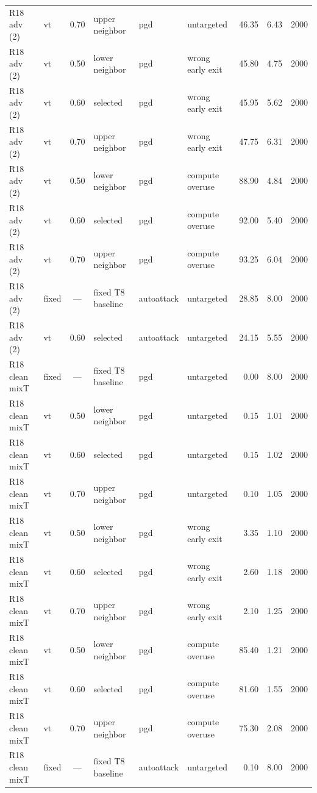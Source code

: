 {\begin{longtable}{@{}l l c l l l r r r@{}}
R18 adv (2) & vt & 0.70 & upper neighbor & pgd & untargeted & 46.35 & 6.43 & 2000 \\
R18 adv (2) & vt & 0.50 & lower neighbor & pgd & wrong early exit & 45.80 & 4.75 & 2000 \\
R18 adv (2) & vt & 0.60 & selected & pgd & wrong early exit & 45.95 & 5.62 & 2000 \\
R18 adv (2) & vt & 0.70 & upper neighbor & pgd & wrong early exit & 47.75 & 6.31 & 2000 \\
R18 adv (2) & vt & 0.50 & lower neighbor & pgd & compute overuse & 88.90 & 4.84 & 2000 \\
R18 adv (2) & vt & 0.60 & selected & pgd & compute overuse & 92.00 & 5.40 & 2000 \\
R18 adv (2) & vt & 0.70 & upper neighbor & pgd & compute overuse & 93.25 & 6.04 & 2000 \\
R18 adv (2) & fixed & --- & fixed T8 baseline & autoattack & untargeted & 28.85 & 8.00 & 2000 \\
R18 adv (2) & vt & 0.60 & selected & autoattack & untargeted & 24.15 & 5.55 & 2000 \\
\addlinespace
R18 clean mixT & fixed & --- & fixed T8 baseline & pgd & untargeted & 0.00 & 8.00 & 2000 \\
R18 clean mixT & vt & 0.50 & lower neighbor & pgd & untargeted & 0.15 & 1.01 & 2000 \\
R18 clean mixT & vt & 0.60 & selected & pgd & untargeted & 0.15 & 1.02 & 2000 \\
R18 clean mixT & vt & 0.70 & upper neighbor & pgd & untargeted & 0.10 & 1.05 & 2000 \\
R18 clean mixT & vt & 0.50 & lower neighbor & pgd & wrong early exit & 3.35 & 1.10 & 2000 \\
R18 clean mixT & vt & 0.60 & selected & pgd & wrong early exit & 2.60 & 1.18 & 2000 \\
R18 clean mixT & vt & 0.70 & upper neighbor & pgd & wrong early exit & 2.10 & 1.25 & 2000 \\
R18 clean mixT & vt & 0.50 & lower neighbor & pgd & compute overuse & 85.40 & 1.21 & 2000 \\
R18 clean mixT & vt & 0.60 & selected & pgd & compute overuse & 81.60 & 1.55 & 2000 \\
R18 clean mixT & vt & 0.70 & upper neighbor & pgd & compute overuse & 75.30 & 2.08 & 2000 \\
R18 clean mixT & fixed & --- & fixed T8 baseline & autoattack & untargeted & 0.10 & 8.00 & 2000 \\

\end{longtable}}
